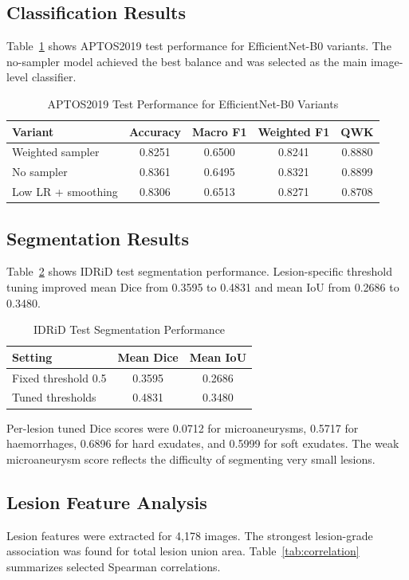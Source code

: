 \documentclass[conference]{IEEEtran}
\begin{document}
\subsection{Classification Results}
Table~\ref{tab:classification} shows APTOS2019 test performance for EfficientNet-B0 variants. The no-sampler model achieved the best balance and was selected as the main image-level classifier.

\begin{table}[htbp]
\centering
\caption{APTOS2019 Test Performance for EfficientNet-B0 Variants}
\label{tab:classification}
\begin{tabular}{lcccc}
\toprule
Variant & Accuracy & Macro F1 & Weighted F1 & QWK \\
\midrule
Weighted sampler & 0.8251 & 0.6500 & 0.8241 & 0.8880 \\
No sampler & 0.8361 & 0.6495 & 0.8321 & 0.8899 \\
Low LR + smoothing & 0.8306 & 0.6513 & 0.8271 & 0.8708 \\
\bottomrule
\end{tabular}
\end{table}

\subsection{Segmentation Results}
Table~\ref{tab:segmentation} shows IDRiD test segmentation performance. Lesion-specific threshold tuning improved mean Dice from 0.3595 to 0.4831 and mean IoU from 0.2686 to 0.3480.

\begin{table}[htbp]
\centering
\caption{IDRiD Test Segmentation Performance}
\label{tab:segmentation}
\begin{tabular}{lcc}
\toprule
Setting & Mean Dice & Mean IoU \\
\midrule
Fixed threshold 0.5 & 0.3595 & 0.2686 \\
Tuned thresholds & 0.4831 & 0.3480 \\
\bottomrule
\end{tabular}
\end{table}

Per-lesion tuned Dice scores were 0.0712 for microaneurysms, 0.5717 for haemorrhages, 0.6896 for hard exudates, and 0.5999 for soft exudates. The weak microaneurysm score reflects the difficulty of segmenting very small lesions.

\subsection{Lesion Feature Analysis}
Lesion features were extracted for 4,178 images. The strongest lesion-grade association was found for total lesion union area. Table~\ref{tab:correlation} summarizes selected Spearman correlations.
\end{document}

